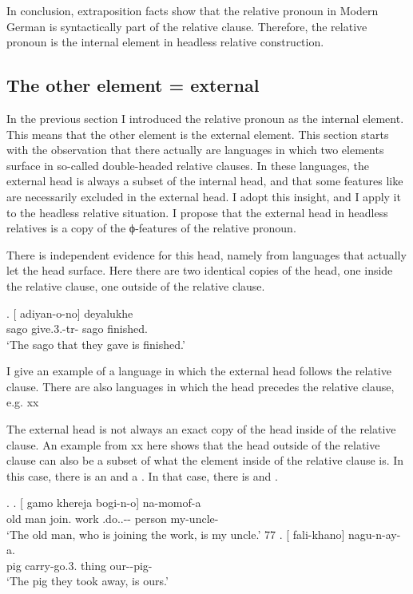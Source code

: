 In conclusion, extraposition facts show that the relative pronoun in Modern German is syntactically part of the relative clause. Therefore, the relative pronoun is the internal element in headless relative construction.


\subsection{The other element = external}\label{sec:external-element}

In the previous section I introduced the relative pronoun as the internal element. This means that the other element is the external element. This section starts with the observation that there actually are languages in which two elements surface in so-called double-headed relative clauses. In these languages, the external head is always a subset of the internal head, and that some features like  are necessarily excluded in the external head. I adopt this insight, and I apply it to the headless relative situation. I propose that the external head in headless relatives is a copy of the ϕ-features of the relative pronoun.

There is independent evidence for this head, namely from languages that actually let the head surface. Here there are two identical copies of the head, one inside the relative clause, one outside of the relative clause.

\exg. [ adiyan-o-no]  deyalukhe\\
 sago give.3.-{tr}- sago finished.\\
 `The sago that they gave is finished.' 

I give an example of a language in which the external head follows the relative clause. There are also languages in which the head precedes the relative clause, e.g. xx

The external head is not always an exact copy of the head inside of the relative clause. An example from xx here shows that the head outside of the relative clause can also be a subset of what the element inside of the relative clause is. In this case, there is an  and a . In that case, there is  and .

\ex.
\ag. [ gamo khereja bogi-n-o]  na-momof-a\\
 {old man} join. work .do..-- person my-uncle-\\
 `The old man, who is joining the work, is my uncle.' 77
\bg. [ fali-khano]  nagu-n-ay-a.\\
 pig carry-go.3. thing our--pig-\\
 `The pig they took away, is ours.' 

